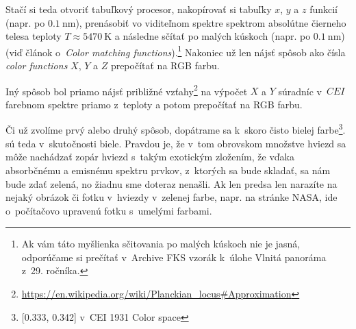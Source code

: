 Stačí si teda otvoriť tabuľkový procesor, nakopírovať si tabuľky $x$, $y$ a $z$ funkcií (napr. po $\SI{0.1}{\nano\metre}$), prenásobiť vo viditeľnom spektre spektrom
absolútne čierneho telesa teploty $T \approx \SI{5470}{\kelvin}$ a následne sčítať po malých kúskoch (napr. po $\SI{0.1}{\nano\metre}$)
(viď článok o~\emph{Color matching functions}).\footnote{Ak vám táto myšlienka sčitovania po malých kúskoch nie je jasná,
odporúčame si prečítať v~Archive FKS vzorák k~úlohe Vlnitá panoráma z~29. ročníka.} Nakoniec už len nájsť spôsob ako čísla \emph{color functions} $X$, $Y$ a $Z$ prepočítať na RGB farbu. 

Iný spôsob bol priamo nájsť približné vzťahy\footnote{\url{https://en.wikipedia.org/wiki/Planckian_locus\#Approximation}} na výpočet $X$ a $Y$ súradníc v~$CEI$ farebnom spektre priamo z~teploty a potom prepočítať na RGB farbu.

Či už zvolíme prvý alebo druhý spôsob, dopátrame sa k~skoro čisto bielej farbe\footnote{[0.333, 0.342] v~CEI 1931 Color space}.
 sú teda v~skutočnosti biele. Pravdou je, že v~tom obrovskom množstve hviezd sa môže
nachádzať zopár hviezd s~takým exotickým zložením, že vďaka absorbčnému a emisnému spektru prvkov, z~ktorých sa bude skladať,
sa nám bude zdať zelená, no žiadnu sme doteraz nenašli. Ak len predsa len narazíte na nejaký obrázok
či fotku v~hviezdy v~zelenej farbe, napr. na stránke NASA, ide o~počítačovo upravenú fotku s~umelými farbami.
